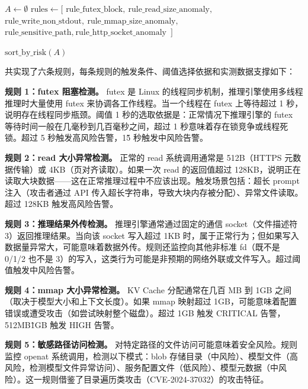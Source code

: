\begin{algorithm}[H]
\caption{异常检测规则引擎}
\label{fig:rule_engine}
\DontPrintSemicolon
{}

$A \leftarrow \emptyset$\;
$\text{rules} \leftarrow [$
    $\text{rule\_futex\_block},\ \text{rule\_read\_size\_anomaly},\ $
    $\text{rule\_write\_non\_stdout},\ \text{rule\_mmap\_size\_anomaly},\ $
    $\text{rule\_sensitive\_path},\ \text{rule\_http\_socket\_anomaly}$
$]$

\Return $\text{sort\_by\_risk}(A)$
\end{algorithm}

共实现了六条规则，每条规则的触发条件、阈值选择依据和实测数据支撑如下：

\textbf{规则 1：futex 阻塞检测。} futex 是 Linux 的线程同步机制，推理引擎使用多线程推理时大量使用 futex 来协调各工作线程。当一个线程在 futex 上等待超过 1 秒，说明存在线程同步瓶颈。阈值 1 秒的选取依据是：正常情况下推理引擎的 futex 等待时间一般在几毫秒到几百毫秒之间，超过 1 秒意味着存在锁竞争或线程死锁。超过 5 秒触发高风险告警，1\~5 秒触发中风险告警。

\textbf{规则 2：read 大小异常检测。} 正常的 read 系统调用通常是 512B（HTTPS 元数据传输）或 4KB（页对齐读取）。如果一次 read 的返回值超过 128KB，说明正在读取大块数据——这在正常推理过程中不应该出现。触发场景包括：超长 prompt 注入（攻击者通过 API 传入超长字符串，导致大块内存被分配）、异常文件读取。超过 128KB 触发高风险告警。

\textbf{规则 3：推理结果外传检测。} 推理引擎通常通过固定的通信 socket（文件描述符 3）返回推理结果。当向该 socket 写入超过 1KB 时，属于正常行为；但如果写入数据量异常大，可能意味着数据外传。规则还监控向其他非标准 fd（既不是 0/1/2 也不是 3）的写入，这类行为可能是非预期的网络外联或文件写入。超过阈值触发中风险告警。

\textbf{规则 4：mmap 大小异常检测。} KV Cache 分配通常在几百 MB 到 1GB 之间（取决于模型大小和上下文长度）。如果 mmap 映射超过 1GB，可能意味着配置错误或遭受攻击（如尝试映射整个磁盘）。超过 1GB 触发 CRITICAL 告警，512MB\~1GB 触发 HIGH 告警。

\textbf{规则 5：敏感路径访问检测。} 对特定路径的文件访问可能意味着安全风险。规则监控 openat 系统调用，检测以下模式：blob 存储目录（中风险）、模型文件（高风险，检测模型文件异常访问）、服务配置文件（低风险）、模型元数据（中风险）。这一规则借鉴了目录遍历类攻击（CVE-2024-37032）的攻击特征。

